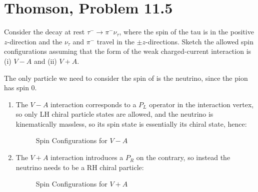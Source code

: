 \documentclass[12pt]{article}
\begin{document}
\section{Thomson, Problem 11.5}
\begin{problem}
  Consider the decay at rest $\tau^-\to\pi^-\nu_\tau$, where the spin of the tau is in the positive $z$-direction and the $\nu_\tau$ and $\pi^-$ travel in the $\pm z$-directions.  Sketch the allowed spin configurations assuming that the form of the weak charged-current interaction is (i) $V-A$ and (ii) $V+A$.
\end{problem}
The only particle we need to consider the spin of is the neutrino, since the pion has spin 0.
\begin{enumerate}[label = (\roman*)]
\item The $V-A$ interaction corresponds to a $P_L$ operator in the interaction vertex, so only LH chiral particle states are allowed, and the neutrino is kinematically massless, so its spin state is essentially its chiral state, hence:
  \begin{figure}[H]
    \centering
    \caption{Spin Configurations for $V-A$}\label{fig:p3a}
  \end{figure}
\item The $V+A$ interaction introduces a $P_R$ on the contrary, so instead the neutrino needs to be a RH chiral particle:
  \begin{figure}[H]
    \centering
    \caption{Spin Configurations for $V+A$}\label{fig:p3b}
  \end{figure}
\end{enumerate}
\newpage
\end{document}
